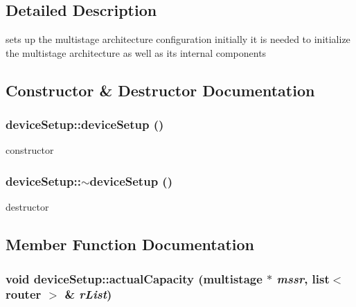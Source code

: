 \subsection{Detailed Description}
sets up the multistage architecture configuration initially it is needed to initialize the multistage architecture as well as its internal components 

\subsection{Constructor \& Destructor Documentation}
\hypertarget{classdeviceSetup_aee6d5a2f08053ef7071853eaefd4ca42}{
\subsubsection[{deviceSetup}]{\setlength{\rightskip}{0pt plus 5cm}deviceSetup::deviceSetup ()}}
\label{classdeviceSetup_aee6d5a2f08053ef7071853eaefd4ca42}


constructor 

\hypertarget{classdeviceSetup_a80a771874b29d08f05f92c1b2c52c348}{
\subsubsection[{$\sim$deviceSetup}]{\setlength{\rightskip}{0pt plus 5cm}deviceSetup::$\sim$deviceSetup ()}}
\label{classdeviceSetup_a80a771874b29d08f05f92c1b2c52c348}


destructor 



\subsection{Member Function Documentation}
\hypertarget{classdeviceSetup_a56a51cc81222dec1a08e1d07eafca000}{
\subsubsection[{actualCapacity}]{\setlength{\rightskip}{0pt plus 5cm}void deviceSetup::actualCapacity ({\bf multistage} $\ast$ {\em mssr}, \/  list$<$ {\bf router} $>$ \& {\em rList})}}
\label{classdeviceSetup_a56a51cc81222dec1a08e1d07eafca000}


